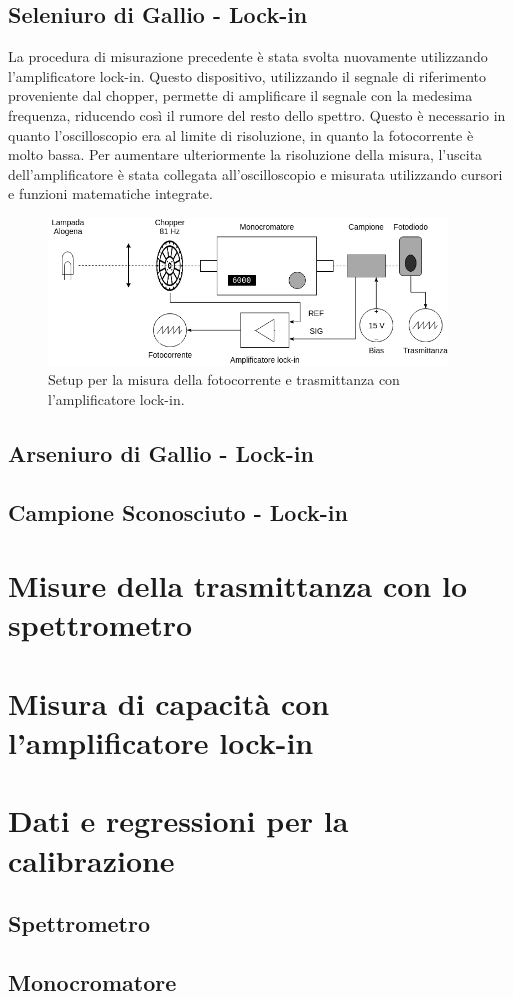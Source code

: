 \documentclass[11pt]{article} %
\begin{document}
\subsection{Seleniuro di Gallio - Lock-in}
La procedura di misurazione precedente è stata svolta nuovamente utilizzando l'amplificatore lock-in. Questo dispositivo, utilizzando il segnale di riferimento proveniente dal chopper, permette di amplificare il segnale con la medesima frequenza, riducendo così il rumore del resto dello spettro. Questo è necessario in quanto l'oscilloscopio era al limite di risoluzione, in quanto la fotocorrente è molto bassa. Per aumentare ulteriormente la risoluzione della misura, l'uscita dell'amplificatore è stata collegata all'oscilloscopio e misurata utilizzando cursori e funzioni matematiche integrate.
\begin{figure}[h!]
\begin{center}
\includegraphics[width=400px]{img/foto_lock.png}
\caption{Setup per la misura della fotocorrente e trasmittanza con l'amplificatore lock-in.}
\end{center}
\end{figure}
\subsection{Arseniuro di Gallio - Lock-in}

\subsection{Campione Sconosciuto - Lock-in}

\section{Misure della trasmittanza con lo spettrometro}

\appendix
\section{Misura di capacità con l'amplificatore lock-in}
\section{Dati e regressioni per la calibrazione}
\subsection{Spettrometro}
\subsection{Monocromatore}
\end{document}
